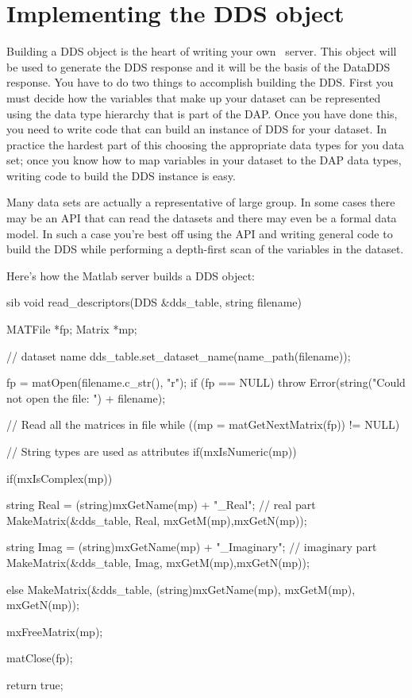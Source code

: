 \documentclass{dods-paper}
\begin{document}
\section{Implementing the DDS object}
\label{server-tut,implementing}

Building a DDS object is the heart of writing your own \opendap\ server. This
object will be used to generate the DDS response and it will be the basis of
the DataDDS response. You have to do two things to accomplish building the
DDS. First you must decide how the variables that make up your dataset can be
represented using the data type hierarchy that is part of the DAP. Once you
have done this, you need to write code that can build an instance of DDS for
your dataset. In practice the hardest part of this choosing the appropriate
data types for you data set; once you know how to map variables in your
dataset to the DAP data types, writing code to build the DDS instance is
easy.

Many data sets are actually a representative of large group. In some cases
there may be an API that can read the datasets and there may even be a
formal data model. In such a case you're best off using the API and
writing general code to build the DDS while performing a depth-first
scan of the variables in the dataset.
 

Here's how the Matlab server builds a DDS object:

\begin{vcode}{sib}
void
read_descriptors(DDS &dds_table, string filename)
{
    MATFile *fp;
    Matrix *mp;
      
    // dataset name
    dds_table.set_dataset_name(name_path(filename));
 
    fp = matOpen(filename.c_str(), "r");
    if (fp == NULL)
        throw Error(string("Could not open the file: ") + filename);

    // Read all the matrices in file
    while ((mp = matGetNextMatrix(fp)) != NULL) {

        // String types are used as attributes
        if(mxIsNumeric(mp)) {
            if(mxIsComplex(mp)) {
                string Real = (string)mxGetName(mp) + "_Real";
                // real part
                MakeMatrix(&dds_table, Real, mxGetM(mp),mxGetN(mp)); 

                string Imag = (string)mxGetName(mp) + "_Imaginary";
                // imaginary part
                MakeMatrix(&dds_table, Imag, mxGetM(mp),mxGetN(mp)); 
         } else
                MakeMatrix(&dds_table, (string)mxGetName(mp), mxGetM(mp),
                            mxGetN(mp)); 
         }

          mxFreeMatrix(mp);
    }
    matClose(fp);

    return true;
}
\end{vcode}
\end{document}

